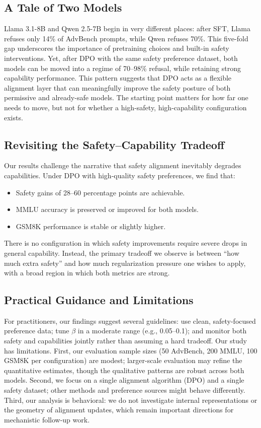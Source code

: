 \documentclass[a4paper, twocolumn, 9pt]{article}
\begin{document}
\subsection{A Tale of Two Models}

Llama 3.1-8B and Qwen 2.5-7B begin in very different places: after SFT, Llama refuses only 14\% of AdvBench prompts, while Qwen refuses 70\%. This five-fold gap underscores the importance of pretraining choices and built-in safety interventions. Yet, after DPO with the same safety preference dataset, both models can be moved into a regime of 70--98\% refusal, while retaining strong capability performance. This pattern suggests that DPO acts as a flexible alignment layer that can meaningfully improve the safety posture of both permissive and already-safe models. The starting point matters for how far one needs to move, but not for whether a high-safety, high-capability configuration exists.

\subsection{Revisiting the Safety--Capability Tradeoff}

Our results challenge the narrative that safety alignment inevitably degrades capabilities. Under DPO with high-quality safety preferences, we find that:
\begin{itemize}
\item Safety gains of 28--60 percentage points are achievable.
\item MMLU accuracy is preserved or improved for both models.
\item GSM8K performance is stable or slightly higher.
\end{itemize}
There is no configuration in which safety improvements require severe drops in general capability. Instead, the primary tradeoff we observe is between ``how much extra safety'' and how much regularization pressure one wishes to apply, with a broad region in which both metrics are strong.

\subsection{Practical Guidance and Limitations}

For practitioners, our findings suggest several guidelines: use clean, safety-focused preference data; tune $\beta$ in a moderate range (e.g., 0.05--0.1); and monitor both safety and capabilities jointly rather than assuming a hard tradeoff. Our study has limitations. First, our evaluation sample sizes (50 AdvBench, 200 MMLU, 100 GSM8K per configuration) are modest; larger-scale evaluation may refine the quantitative estimates, though the qualitative patterns are robust across both models. Second, we focus on a single alignment algorithm (DPO) and a single safety dataset; other methods and preference sources might behave differently. Third, our analysis is behavioral: we do not investigate internal representations or the geometry of alignment updates, which remain important directions for mechanistic follow-up work.
\end{document}
